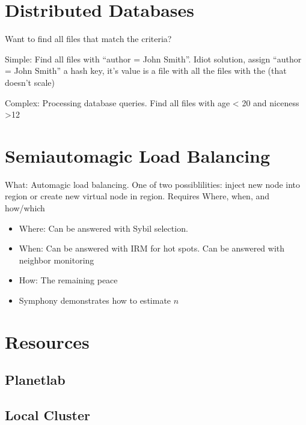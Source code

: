 \documentclass[10pt,letterpaper,twoside]{report}
\begin{document}
\section{Distributed Databases}


Want to find all files that match the criteria?

Simple: Find all files with ``author = John Smith''.  Idiot solution, assign ``author = John Smith'' a hash key,  it's value is a file with all the files with the (that doesn't scale) 


Complex: Processing database queries.   Find all files with age < 20 and niceness >12


\section{Semiautomagic Load Balancing}
What: Automagic load balancing.  One of two possiblilities:  inject new node into region or create new virtual node in region. 
Requires Where, when, and how/which

\begin{itemize}
    \item Where: Can be answered with Sybil selection.
    \item When:  Can be answered with IRM for hot spots.  Can be answered with neighbor monitoring
    \item How:  The remaining peace
    \item Symphony demonstrates how to estimate $n$
\end{itemize}
\section{Resources}
\subsection{Planetlab}
\subsection{Local Cluster}





\end{document}
